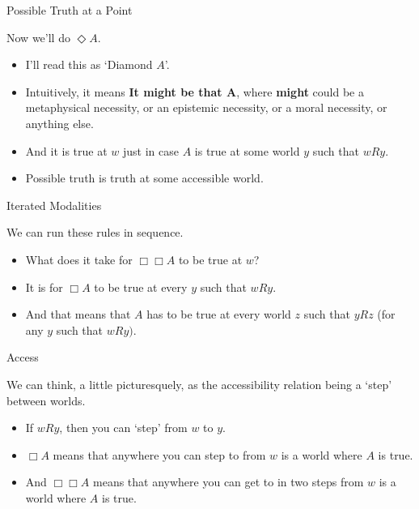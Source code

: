\documentclass[
  ignorenonframetext,
]{beamer}
\providecommand{\tightlist}{%
  \setlength{\itemsep}{0pt}\setlength{\parskip}{0pt}}
\renewcommand{\,}{\text{, }}
\begin{document}
\begin{frame}{Possible Truth at a Point}
\protect\hypertarget{possible-truth-at-a-point}{}

Now we'll do \(\Diamond A\).

\begin{itemize}
\tightlist
\item
  I'll read this as `Diamond \(A\)'.\pause
\item
  Intuitively, it means \textbf{It might be that A}, where
  \textbf{might} could be a metaphysical necessity, or an epistemic
  necessity, or a moral necessity, or anything else.\pause
\item
  And it is true at \(w\) just in case \(A\) is true at some world \(y\)
  such that \(wRy\).
\item
  Possible truth is truth at some accessible world.
\end{itemize}

\end{frame}

\begin{frame}{Iterated Modalities}
\protect\hypertarget{iterated-modalities}{}

We can run these rules in sequence.\pause

\begin{itemize}
\tightlist
\item
  What does it take for \(\Box \Box A\) to be true at \(w\)? \pause
\item
  It is for \(\Box A\) to be true at every \(y\) such that
  \(wRy\).\pause
\item
  And that means that \(A\) has to be true at every world \(z\) such
  that \(yRz\) (for any \(y\) such that \(wRy)\).
\end{itemize}

\end{frame}

\begin{frame}{Access}
\protect\hypertarget{access}{}

We can think, a little picturesquely, as the accessibility relation
being a `step' between worlds.

\begin{itemize}
\tightlist
\item
  If \(wRy\), then you can `step' from \(w\) to \(y\).\pause
\item
  \(\Box A\) means that anywhere you can step to from \(w\) is a world
  where \(A\) is true.\pause
\item
  And \(\Box \Box A\) means that anywhere you can get to in two steps
  from \(w\) is a world where \(A\) is true.
\end{itemize}

\end{frame}
\end{document}
